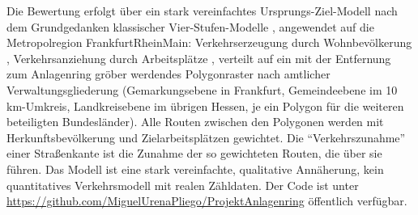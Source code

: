 \documentclass[a4paper,12pt]{article}
\begin{document}
Die Bewertung erfolgt über ein stark vereinfachtes Ursprungs-Ziel-Modell nach dem Grundgedanken klassischer Vier-Stufen-Modelle \autocite{ortuzarwillumsen2011}, angewendet auf die Metropolregion FrankfurtRheinMain: Verkehrserzeugung durch Wohnbevölkerung \autocite{worldpop2020}, Verkehrsanziehung durch Arbeitsplätze \autocite{bundesagenturfurarbeit2025}, verteilt auf ein mit der Entfernung zum Anlagenring gröber werdendes Polygonraster nach amtlicher Verwaltungsgliederung \autocite{hvbg2026} (Gemarkungsebene in Frankfurt, Gemeindeebene im 10\,km-Umkreis, Landkreisebene im übrigen Hessen, je ein Polygon für die weiteren beteiligten Bundesländer). Alle Routen zwischen den Polygonen werden mit Herkunftsbevölkerung und Zielarbeitsplätzen gewichtet. Die \enquote{Verkehrszunahme} einer Straßenkante ist die Zunahme der so gewichteten Routen, die über sie führen. Das Modell ist eine stark vereinfachte, qualitative Annäherung, kein quantitatives Verkehrsmodell mit realen Zähldaten. Der Code ist unter \url{https://github.com/MiguelUrenaPliego/ProjektAnlagenring} öffentlich verfügbar.
\end{document}
